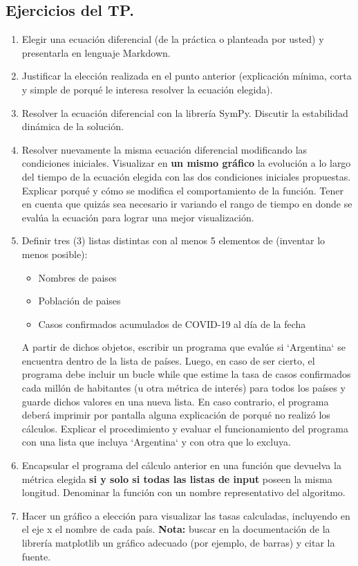 \documentclass[a4paper,11pt]{article}
\begin{document}
\subsection*{Ejercicios del TP.}
	\begin{enumerate}
		\item Elegir una ecuación diferencial (de la práctica o planteada por usted) y presentarla en lenguaje Markdown.
		\item Justificar la elección realizada en el punto anterior (explicación mínima, corta y simple de porqué le interesa resolver la ecuación elegida).
		\item Resolver la ecuación diferencial con la librería SymPy. Discutir la estabilidad dinámica de la solución. 
		\item Resolver nuevamente la misma ecuación diferencial modificando las condiciones iniciales. Visualizar en \textbf{un mismo gráfico} la evolución a lo largo del tiempo de la ecuación elegida con las dos condiciones iniciales propuestas. Explicar porqué y cómo se modifica el comportamiento de la función. Tener en cuenta que quizás sea necesario ir variando el rango de tiempo en donde se evalúa la ecuación para lograr una mejor visualización.
		
		\item Definir tres (3) listas distintas con al menos 5 elementos de (inventar lo menos posible):
		    \begin{itemize}
		        \item Nombres de paises
		        \item Población de paises
		        \item Casos confirmados acumulados de COVID-19 al día de la fecha  
		    \end{itemize}
        A partir de dichos objetos, escribir un programa que evalúe si `Argentina` se encuentra dentro de la lista de países. Luego, en caso de ser cierto, el programa debe incluir un bucle while que estime la tasa de casos confirmados cada millón de habitantes (u otra métrica de interés) para todos los países y guarde dichos valores en una nueva lista. En caso contrario, el programa deberá imprimir por pantalla alguna explicación de porqué no realizó los cálculos. Explicar el procedimiento y evaluar el funcionamiento del programa con una lista que incluya `Argentina` y con otra que lo excluya.
        \item Encapsular el programa del cálculo anterior en una función que devuelva la métrica elegida \textbf{si y solo si todas las listas de input} poseen la misma longitud. Denominar la función con un nombre representativo del algoritmo.
        \item Hacer un gráfico a elección para visualizar las tasas calculadas, incluyendo en el eje x el nombre de cada país. \textbf{Nota:} buscar en la documentación de la librería matplotlib un gráfico adecuado (por ejemplo, de barras) y citar la fuente.

\end{enumerate}
\end{document}
